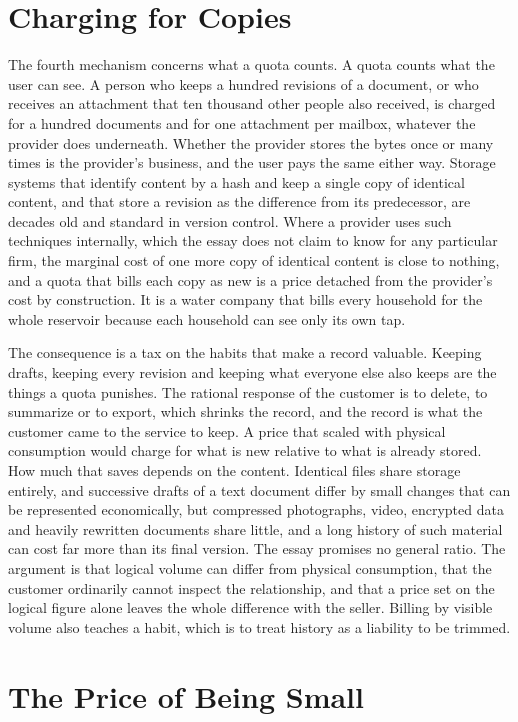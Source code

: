 \documentclass[11pt]{article}
\begin{document}
\section{Charging for Copies}

The fourth mechanism concerns what a quota counts. A quota counts what the user can see. A person who keeps a hundred revisions of a document, or who receives an attachment that ten thousand other people also received, is charged for a hundred documents and for one attachment per mailbox, whatever the provider does underneath. Whether the provider stores the bytes once or many times is the provider's business, and the user pays the same either way. Storage systems that identify content by a hash and keep a single copy of identical content, and that store a revision as the difference from its predecessor, are decades old and standard in version control. Where a provider uses such techniques internally, which the essay does not claim to know for any particular firm, the marginal cost of one more copy of identical content is close to nothing, and a quota that bills each copy as new is a price detached from the provider's cost by construction. It is a water company that bills every household for the whole reservoir because each household can see only its own tap.

The consequence is a tax on the habits that make a record valuable. Keeping drafts, keeping every revision and keeping what everyone else also keeps are the things a quota punishes. The rational response of the customer is to delete, to summarize or to export, which shrinks the record, and the record is what the customer came to the service to keep. A price that scaled with physical consumption would charge for what is new relative to what is already stored. How much that saves depends on the content. Identical files share storage entirely, and successive drafts of a text document differ by small changes that can be represented economically, but compressed photographs, video, encrypted data and heavily rewritten documents share little, and a long history of such material can cost far more than its final version. The essay promises no general ratio. The argument is that logical volume can differ from physical consumption, that the customer ordinarily cannot inspect the relationship, and that a price set on the logical figure alone leaves the whole difference with the seller. Billing by visible volume also teaches a habit, which is to treat history as a liability to be trimmed.

\section{The Price of Being Small}
\end{document}
